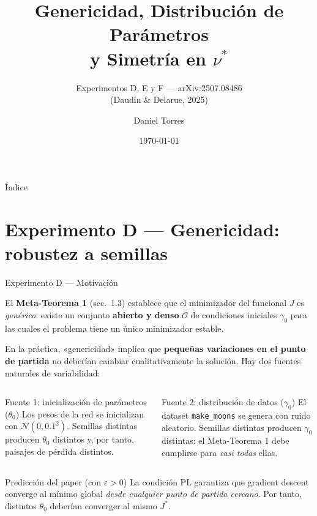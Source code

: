 \documentclass[10pt]{beamer}
\title[Experimentos D, E y F — Genericidad y Distribución de $\nu^*$]{%
  Genericidad, Distribución de Parámetros\\y Simetría en $\nu^*$}
\subtitle{Experimentos D, E y F — arXiv:2507.08486\\(Daudin \& Delarue, 2025)}
\author[Daniel Torres]{Daniel Torres}
\institute[CSIC]{Consejo Superior de Investigaciones Científicas (CSIC)\\
Beca de Introducción a la Investigación JAE\\
\medskip
{\small Tutor: Rafael Orive}}
\date{\today}
\begin{document}
\begin{frame}
  \titlepage
\end{frame}

\begin{frame}{Índice}
  \tableofcontents
\end{frame}

\section{Experimento D — Genericidad: robustez a semillas}

\begin{frame}{Experimento D — Motivación}

El \textbf{Meta-Teorema 1} (sec.\ 1.3) establece que el minimizador del funcional $J$ es \emph{genérico}: existe un conjunto \textbf{abierto y denso} $\mathcal{O}$ de condiciones iniciales $\gamma_0$ para las cuales el problema tiene un único minimizador estable.

\medskip
En la práctica, «genericidad» implica que \textbf{pequeñas variaciones en el punto de partida} no deberían cambiar cualitativamente la solución. Hay dos fuentes naturales de variabilidad:

\begin{columns}
\begin{block}{Fuente 1: inicialización de parámetros ($\theta_0$)}
  Los pesos de la red se inicializan con $\mathcal{N}(0, 0.1^2)$. Semillas distintas producen $\theta_0$ distintos y, por tanto, paisajes de pérdida distintos.
\end{block}

\begin{block}{Fuente 2: distribución de datos ($\gamma_0$)}
  El dataset \texttt{make\_moons} se genera con ruido aleatorio. Semillas distintas producen $\gamma_0$ distintas: el Meta-Teorema 1 debe cumplirse para \emph{casi todas} ellas.
\end{block}
\end{columns}

\bigskip
\begin{alertblock}{Predicción del paper (con $\varepsilon > 0$)}
  La condición PL garantiza que gradient descent converge al mínimo global \emph{desde cualquier punto de partida cercano}. Por tanto, distintos $\theta_0$ deberían converger al mismo $J^*$.
\end{alertblock}

\end{frame}
\end{document}
